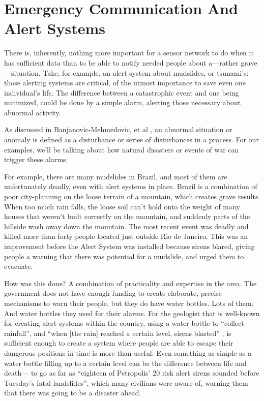 \documentclass[conference]{IEEEtran}
\begin{document}
\section{Emergency Communication And Alert Systems} %
There is, inherently, nothing more important for a sensor network to do when it has sufficient data than 
to be able to notify needed people about a—rather grave—situation. Take, for example, an alert system 
about mudslides, or tsunami's: those alerting systems are critical, of the utmost importance to save even 
one individual's life. The difference between a catastrophic event and one being minimized, could be done 
by a simple alarm, alerting those necessary about abnormal activity.\par

As discussed in Banjanovic-Mehmedovic, et al \cite{iz1}, an abnormal situation or anomaly is defined 
as a disturbance or series of disturbances in a process. For our examples, we'll be talking 
about how natural disasters or events of war can trigger these alarms. \par

For example, there are many mudslides in Brazil, and most of them are unfortunately deadly, even with 
alert systems in place. Brazil is a combination of poor city-planning on the loose 
terrain of a mountain, which creates grave results. When too much rain falls, the loose soil 
can't hold onto the weight of many houses that weren't built correctly on the mountain, 
and suddenly parts of the hillside wash away down the mountain. The most recent event was deadly and killed 
more than forty people located just outside Rio de Janeiro. This was an improvement before the Alert System
was installed because sirens blared, giving people a warning that there was potential for a mudslide, 
and urged them to evacuate.\par

How was this done? A combination of practicality and expertise in the area. The government does not have 
enough funding to create elaborate, precise mechanisms to warn their people, but they do have water 
bottles. Lots of them. And water bottles they used for their alarms. For the geologist that is well-known 
for creating alert systems within the country, using a water bottle to ``collect rainfall'', and ``when [the 
rain] reached a certain level, sirens blasted'' \cite{iz2}, is sufficient enough to create a system where people 
are able to escape their dangerous positions in time is more than useful. Even something as simple as a 
water bottle filling up to a certain level can be the difference between life and death— to go as far as 
``eighteen of Petropolis' 20 risk alert sirens sounded before Tuesday's fatal landslides'', \cite{iz2} which many 
civilians were aware of, warning them that there was going to be a disaster ahead. \par
\end{document}
